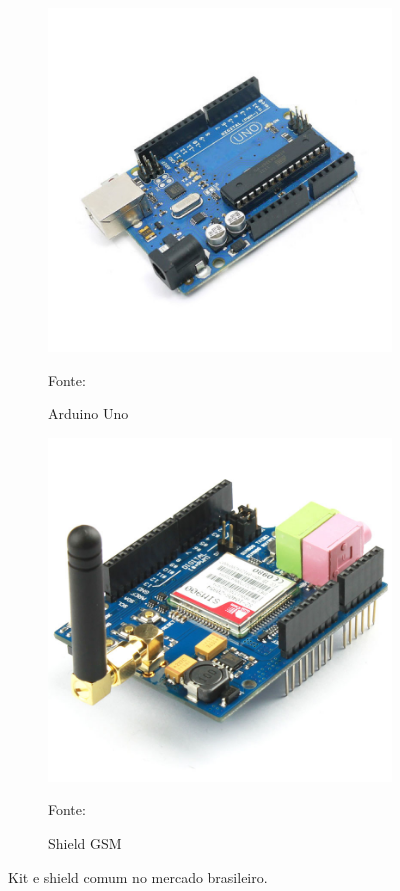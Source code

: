 \begin{figure}[h!]
\centering
  \begin{subfigure}[b]{0.5\textwidth}
  \centering
    \includegraphics[width=\textwidth]{figuras/arduino_uno.jpg}
    \caption{Arduino Uno} Fonte: \cite{bib_uno}
    \label{fig:arduino}
  \end{subfigure}
  \begin{subfigure}[b]{0.4\textwidth}
  \centering
    \includegraphics[width=\textwidth]{figuras/shield_gsm.jpg}
    \caption{Shield GSM} Fonte: \cite{bib_gsm}
    \label{fig:shield_gsm}
  \end{subfigure}
  \caption{Kit e shield comum no mercado brasileiro.}
\end{figure}

